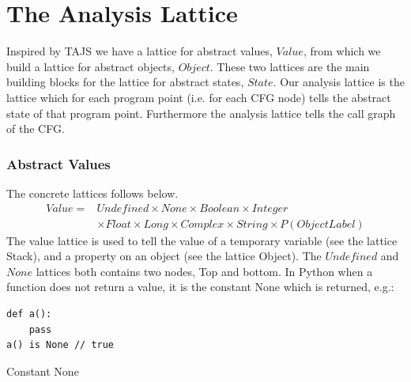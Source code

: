 \chapter{The Analysis Lattice}
Inspired by TAJS we have a lattice for abstract values, $Value$, from which we build a lattice for abstract objects, $Object$. These two lattices are the main building blocks for the lattice for abstract states, $State$. Our analysis lattice is the lattice which for each program point (i.e. for each CFG node) tells the abstract state of that program point. Furthermore the analysis lattice tells the call graph of the CFG.

\subsection{Abstract Values}
The concrete lattices follows below.
\begin{eqnarray*}
Value =& Undefined \times None \times Boolean \times Integer \\
       & \times Float \times Long \times Complex \times String \times P(ObjectLabel)
\end{eqnarray*}
The value lattice is used to tell the value of a temporary variable (see the lattice Stack), and a property on an object (see the lattice Object). The $Undefined$ and $None$ lattices both contains two nodes, Top and bottom. In Python when a function does not return a value, it is the constant None\cite{pyref.constants} which is returned, e.g.:
\begin{listing}[H]
	\begin{verbatim}
def a(): 
	pass
a() is None // true
	\end{verbatim}
	\caption{Constant None}\label{code:NoneExample}
\end{listing}

